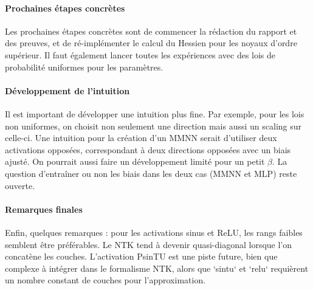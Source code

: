 \paragraph{Prochaines étapes concrètes}
Les prochaines étapes concrètes sont de commencer la rédaction du rapport et des preuves, et de ré-implémenter le calcul du Hessien pour les noyaux d'ordre supérieur. Il faut également lancer toutes les expériences avec des lois de probabilité uniformes pour les paramètres.

\paragraph{Développement de l'intuition}
Il est important de développer une intuition plus fine. Par exemple, pour les lois non uniformes, on choisit non seulement une direction mais aussi un scaling sur celle-ci. Une intuition pour la création d'un MMNN serait d'utiliser deux activations opposées, correspondant à deux directions opposées avec un biais ajusté. On pourrait aussi faire un développement limité pour un petit $\beta$. La question d'entraîner ou non les biais dans les deux cas (MMNN et MLP) reste ouverte.

\paragraph{Remarques finales}
Enfin, quelques remarques : pour les activations sinus et ReLU, les rangs faibles semblent être préférables. Le NTK tend à devenir quasi-diagonal lorsque l'on concatène les couches. L'activation PsinTU est une piste future, bien que complexe à intégrer dans le formalisme NTK, alors que `sintu` et `relu` requièrent un nombre constant de couches pour l'approximation.

